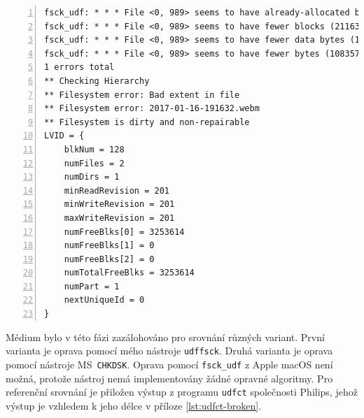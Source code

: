 \begin{lstlisting}[frame=single,caption={Výsledek kontroly poškozeného média programem \texttt{fsck\_udf}},label=lst:fsck-udf-mac,basicstyle=\ttfamily\scriptsize, keywordstyle=\color{black}\bfseries\underbar,nolol,numbers=left,texcl=false]
fsck_udf: * * * File <0, 989> seems to have already-allocated blocks! * * *
fsck_udf: * * * File <0, 989> seems to have fewer blocks (2116354) than expected (19202) * * *
fsck_udf: * * * File <0, 989> seems to have fewer data bytes (1083573248) than expected (9830400) * * *
fsck_udf: * * * File <0, 989> seems to have fewer bytes (1083573248) than expected (9830400) * * *
1 errors total
** Checking Hierarchy
** Filesystem error: Bad extent in file
** Filesystem error: 2017-01-16-191632.webm
** Filesystem is dirty and non-repairable
LVID = {
    blkNum = 128
    numFiles = 2
    numDirs = 1
    minReadRevision = 201
    minWriteRevision = 201
    maxWriteRevision = 201
    numFreeBlks[0] = 3253614
    numFreeBlks[1] = 0
    numFreeBlks[2] = 0
    numTotalFreeBlks = 3253614
    numPart = 1
    nextUniqueId = 0
}
\end{lstlisting}
Médium bylo v této fázi zazálohováno pro srovnání různých variant. První varianta je oprava pomocí mého nástroje \texttt{udffsck}. Druhá varianta je oprava pomocí nástroje MS~\texttt{CHKDSK}. Oprava pomocí \texttt{fsck\_udf} z Apple macOS není možná, protože nástroj nemá implementovány žádné opravné algoritmy. Pro referenční srovnání je přiložen výstup z programu \texttt{udfct} společnosti Philips, jehož výstup je vzhledem k jeho délce v příloze \ref{lst:udfct-broken}.\\
